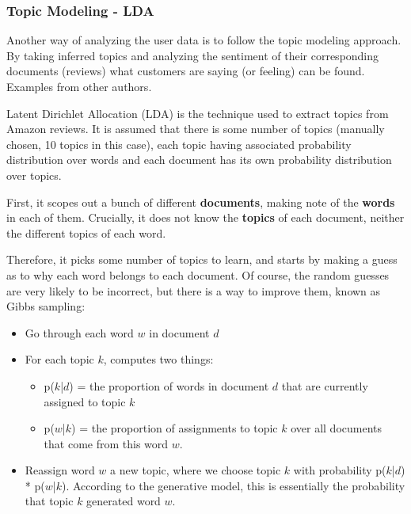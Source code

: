 \subsubsection{\textbf{Topic Modeling - LDA}}

Another way of analyzing the user data is to follow the topic modeling approach. By taking inferred topics and analyzing the sentiment of their corresponding documents (reviews) what customers are saying (or feeling) can be found. Examples from other authors\cite{bhatt2015amazon}\cite{chakankarsentiment}\cite{Mukherjee2012}\cite{rain2013sentiment}.

Latent Dirichlet Allocation (LDA) is the technique used to extract topics from Amazon reviews. It is assumed that there is some number of topics (manually chosen, 10 topics in this case), each topic having associated probability distribution over words and each document has its own probability distribution over topics. 

First, it scopes out a bunch of different \textbf{documents}, making note of the \textbf{words} in each of them. Crucially, it does not know the \textbf{topics} of each document, neither the different topics of each word.

Therefore, it picks some number of topics to learn, and starts by making a guess as to why each word belongs to each document. Of course, the random guesses are very likely to be incorrect, but there is a way to improve them, known as Gibbs sampling:
\begin{itemize}[noitemsep]
\begin{itemize} [topsep=6pt]
\item Go through each word $w$ in document $d$
\item For each topic $k$, computes two things: 
	\begin{itemize}
	\item p($k$|$d$) = the proportion of words in document $d$ that are currently assigned to topic $k$
	\item p($w$|$k$) = the proportion of assignments to topic $k$ over all documents that come from this word $w$. 
	\end{itemize}
\item Reassign word $w$ a new topic, where we choose topic $k$ with probability p($k$|$d$) * p($w$|$k$). According to the generative model, this is essentially the probability that topic $k$ generated word $w$.
\end{itemize}
\end{itemize}

